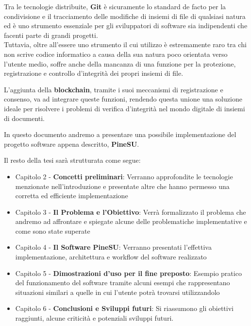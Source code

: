 Tra le tecnologie distribuite, \textbf{Git} è sicuramente lo standard de facto per la condivisione
e il tracciamento delle modifiche di insiemi di file di qualsiasi natura ed è uno strumento essenziale per
gli sviluppatori di software sia indipendenti che facenti parte di grandi progetti.
\\
Tuttavia, oltre all'essere uno strumento il cui utilizzo è estremamente raro tra
chi non scrive codice informatico a causa della sua natura poco orientata verso
l'utente medio, soffre anche della mancanza di una funzione per la protezione,
registrazione e controllo d'integrità dei propri insiemi di file.

L'aggiunta della \textbf{blockchain}, tramite i suoi meccanismi di registrazione e consenso,
va ad integrare queste funzioni, rendendo questa unione una soluzione ideale per risolvere
i problemi di verifica d'integrità nel mondo digitale di insiemi di documenti.

In questo documento andremo a presentare una possibile implementazione del
progetto software appena descritto, \textbf{PineSU}.

Il resto della tesi sarà strutturata come segue:
\begin{itemize}
    \item Capitolo 2 - \textbf{Concetti preliminari}: Verranno approfondite le tecnologie menzionate nell'introduzione e presentate altre che hanno permesso una corretta ed efficiente implementazione
    \item Capitolo 3 - \textbf{Il Problema e l'Obiettivo}: Verrà formalizzato il problema che andremo ad affrontare e spiegate alcune delle problematiche implementative e come sono state superate
    \item Capitolo 4 - \textbf{Il Software PineSU}: Verranno presentati l'effettiva implementazione, architettura e workflow del software realizzato
    \item Capitolo 5 - \textbf{Dimostrazioni d'uso per il fine preposto}: Esempio pratico del funzionamento del software tramite alcuni esempi che rappresentano situazioni similari a quelle in cui l'utente potrà trovarsi utilizzandolo
    \item Capitolo 6 - \textbf{Conclusioni e Sviluppi futuri}: Si riassumono gli obiettivi raggiunti, alcune criticità e potenziali sviluppi futuri.
\end{itemize}
